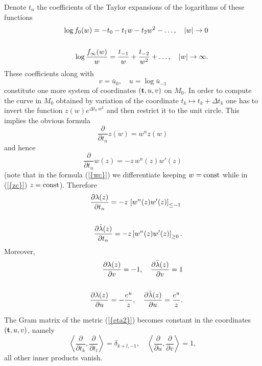 \documentclass[numbook, envcountsame, envcountreset]{svjour3}
\begin{document}
Denote $t_n$ the coefficients of the Taylor expansions of the logarithms of these functions
\begin{eqnarray}\label{flat}
&&
\log f_0(w) = -t_0 - t_1 w - t_2 w^2 -\dots, \quad |w| \to 0
{\nonumber}\\
&&
\\
&&
\log\frac{f_\infty(w)}{w}=\frac{t_{-1}}{w} +\frac{t_{-2}}{w^2}+\dots, \quad |w|\to\infty.
{\nonumber}
\end{eqnarray}
These coefficients along with
\begin{equation}\label{flat1}
v=\bar u_0, \quad u=\log \bar u_{-1}
\end{equation}
constitute one more system of coordinates $({\bf t}, u, v)$ on $M_0$. In order to compute the curve in $M_0$ obtained by variation of the coordinate $t_k\mapsto t_k +\Delta t_k$ one has to invert the function
$z(w) e^{\Delta t_k\, w^k}$ and then restrict it to the unit circle. This implies the obvious formula
\begin{equation}\label{wc}
\frac{\partial}{{\partial} t_n} z(w)=w^n z(w)
\end{equation}
and hence
\begin{equation}\label{zc}
\frac{\partial}{{\partial} t_n} w(z) =-z\,w^n(z) w'(z)
\end{equation}
(note that in the formula {(\ref{{wc}})} we differentiate keeping $w={\rm const}$ while in {(\ref{{zc}})}  $z={\rm const}$). Therefore
\begin{eqnarray}\label{lamt}
&&
\frac{{\partial}\lambda(z)}{{\partial} t_n} =-z\,\left[w^n(z) w'(z)\right]_{\leq -1}
{\nonumber}\\
&&
\\
&&
\frac{{\partial}\bar\lambda(z)}{{\partial} t_n} =-z\left[w^n(z) w'(z)\right]_{\geq 0}.
{\nonumber}
\end{eqnarray}
Moreover,
\begin{eqnarray}\label{lamuv}
&&
\frac{{\partial} \lambda(z)}{{\partial} v}=-1, \quad \frac{{\partial} \bar\lambda(z)}{{\partial} v}=1
{\nonumber}\\
&&
\\
&&
\frac{{\partial} \lambda(z)}{{\partial} u}=-\frac{e^u}{z}, \quad \frac{{\partial} \bar\lambda(z)}{{\partial} u}=\frac{e^u}{z}.
{\nonumber}
\end{eqnarray}

\begin{lemma} The Gram matrix of the metric {(\ref{{eta2}})} becomes constant in the coordinates $({\bf t}, u, v)$, namely
\begin{equation}\label{flat5}
\left\langle \frac{\partial}{{\partial} t_k}, \frac{\partial}{{\partial} t_l}\right\rangle =\delta_{k+l, -1}, \quad \left<\frac{\partial}{{\partial} u}, \frac{\partial}{{\partial} v}\right> =1,
\end{equation}
all other inner products vanish.
\end{lemma}
\end{document}

